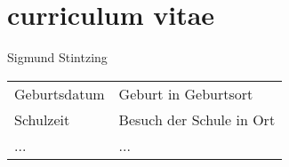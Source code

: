 \chapter*{curriculum vitae}

Sigmund Stintzing

\vspace*{2.0cm}

\begin{tabular}{ll}

Geburtsdatum & Geburt in Geburtsort \\[1.5ex]
Schulzeit & Besuch der Schule in Ort \\[1.5ex]
 ... & ...
\end{tabular}
